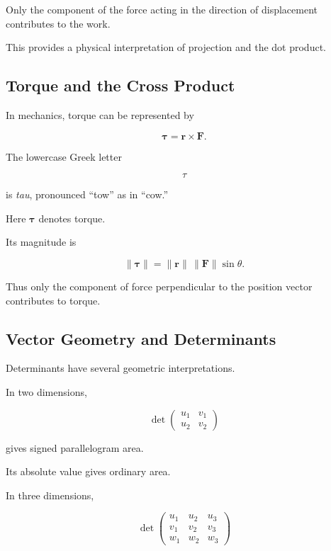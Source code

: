Only the component of the force acting in the direction of displacement
contributes to the work.

This provides a physical interpretation of projection and the dot product.

\subsection{Torque and the Cross Product}
\label{subsec:torque-cross-product}

In mechanics, torque can be represented by

\[ \boxed{\boldsymbol{\tau}=\mathbf{r}\times\mathbf{F}.} \]

The lowercase Greek letter

\[ \tau \]

is \emph{tau}, pronounced ``tow'' as in ``cow.''

Here \(\boldsymbol{\tau}\) denotes torque.

Its magnitude is

\[ \|\boldsymbol{\tau}\|
=\|\mathbf{r}\|\,\|\mathbf{F}\|\sin\theta. \]

Thus only the component of force perpendicular to the position vector
contributes to torque.

\subsection{Vector Geometry and Determinants}
\label{subsec:vector-geometry-determinants}

Determinants have several geometric interpretations.

In two dimensions,

\[
\det
\begin{pmatrix}
u_1&v_1\\
u_2&v_2
\end{pmatrix}
\]

gives signed parallelogram area.

Its absolute value gives ordinary area.

In three dimensions,

\[
\det
\begin{pmatrix}
u_1&u_2&u_3\\
v_1&v_2&v_3\\
w_1&w_2&w_3
\end{pmatrix}
\]

